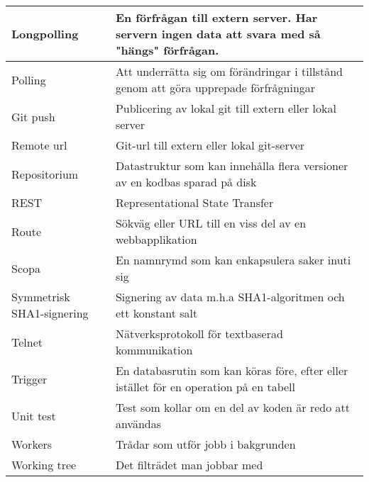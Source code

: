 \begin{tabular} { | l | p{10cm} | }
\hline
Longpolling & En förfrågan till extern server. Har servern ingen data att svara med så "hängs" förfrågan. \\
\hline
Polling & Att underrätta sig om förändringar i tillstånd genom att göra upprepade förfrågningar \\
\hline
Git push & Publicering av lokal git till extern eller lokal server \\
\hline
Remote url & Git-url till extern eller lokal git-server \\
\hline
Repositorium & Datastruktur som kan innehålla flera versioner av en kodbas sparad på disk \\
\hline
REST & Representational State Transfer \\
\hline
Route & Sökväg eller URL till en viss del av en webbapplikation \\
\hline
Scopa & En namnrymd som kan enkapsulera saker inuti sig \\
\hline
Symmetrisk SHA1-signering & Signering av data m.h.a SHA1-algoritmen och ett konstant salt \\
\hline
Telnet & Nätverksprotokoll för textbaserad kommunikation \\
\hline
Trigger & En databasrutin som kan köras före, efter eller istället för en operation på en tabell  \\
\hline
Unit test & Test som kollar om en del av koden är redo att användas \\
\hline
Workers & Trådar som utför jobb i bakgrunden \\
\hline
Working tree & Det filträdet man jobbar med \\
\hline
\end{tabular}
\normalsize

